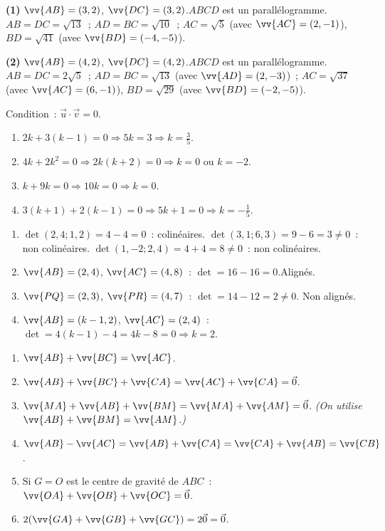 
\textbf{(1)} $\vv{AB}=(3,2)$, $\vv{DC}=(3,2)$.\checkmark\quad $ABCD$ est un parall\'elogramme.
$AB=DC=\sqrt{13}$~; $AD=BC=\sqrt{10}$~; $AC=\sqrt{5}$ (avec $\vv{AC}=(2,-1)$), $BD=\sqrt{41}$ (avec $\vv{BD}=(-4,-5)$).

\textbf{(2)} $\vv{AB}=(4,2)$, $\vv{DC}=(4,2)$.\checkmark\quad $ABCD$ est un parall\'elogramme.
$AB=DC=2\sqrt{5}$~; $AD=BC=\sqrt{13}$ (avec $\vv{AD}=(2,-3)$)~; $AC=\sqrt{37}$ (avec $\vv{AC}=(6,-1)$), $BD=\sqrt{29}$ (avec $\vv{BD}=(-2,-5)$).


Condition~: $\vec{u}\cdot\vec{v}=0$.
\begin{enumerate}
  \item $2k+3(k-1)=0\Rightarrow5k=3\Rightarrow k=\tfrac{3}{5}$.
  \item $4k+2k^2=0\Rightarrow2k(k+2)=0\Rightarrow k=0$ ou $k=-2$.
  \item $k+9k=0\Rightarrow10k=0\Rightarrow k=0$.
  \item $3(k+1)+2(k-1)=0\Rightarrow5k+1=0\Rightarrow k=-\tfrac{1}{5}$.
\end{enumerate}


\begin{enumerate}
  \item $\det(2,4;1,2)=4-4=0$~: colin\'eaires.\checkmark\quad
        $\det(3,1;6,3)=9-6=3\ne0$~: non colin\'eaires.\quad
        $\det(1,-2;2,4)=4+4=8\ne0$~: non colin\'eaires.
  \item $\vv{AB}=(2,4)$, $\vv{AC}=(4,8)$~: $\det=16-16=0$.\checkmark\quad Align\'es.
  \item $\vv{PQ}=(2,3)$, $\vv{PR}=(4,7)$~: $\det=14-12=2\ne0$. Non align\'es.
  \item $\vv{AB}=(k-1,2)$, $\vv{AC}=(2,4)$~: $\det=4(k-1)-4=4k-8=0\Rightarrow k=2$.
\end{enumerate}


\begin{enumerate}
  \item $\vv{AB}+\vv{BC}=\vv{AC}$.
  \item $\vv{AB}+\vv{BC}+\vv{CA}=\vv{AC}+\vv{CA}=\vec{0}$.
  \item $\vv{MA}+\vv{AB}+\vv{BM}=\vv{MA}+\vv{AM}=\vec{0}$.
        \emph{(On utilise $\vv{AB}+\vv{BM}=\vv{AM}$.)}
  \item $\vv{AB}-\vv{AC}=\vv{AB}+\vv{CA}=\vv{CA}+\vv{AB}=\vv{CB}$.
  \item Si $G=O$ est le centre de gravité de $ABC$~: $\vv{OA}+\vv{OB}+\vv{OC}=\vec{0}$.
  \item $2(\vv{GA}+\vv{GB}+\vv{GC})=2\vec{0}=\vec{0}$.
\end{enumerate}

